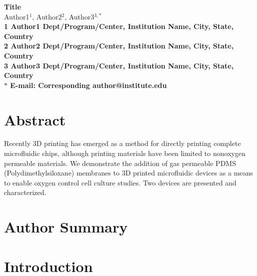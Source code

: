 \pagestyle{myheadings}







\begin{flushleft}
{\Large
\textbf{Title}
}
\\
Author1$^{1}$, 
Author2$^{2}$, 
Author3$^{3,\ast}$
\\
\bf{1} Author1 Dept/Program/Center, Institution Name, City, State, Country
\\
\bf{2} Author2 Dept/Program/Center, Institution Name, City, State, Country
\\
\bf{3} Author3 Dept/Program/Center, Institution Name, City, State, Country
\\
$\ast$ E-mail: Corresponding author@institute.edu
\end{flushleft}

\section*{Abstract}

Recently 3D printing has emerged as a method for directly printing complete microfluidic chips, 
although printing materials have been limited to non­oxygen permeable materials.
We demonstrate the addition of gas permeable PDMS (Polydimethylsiloxane) membranes to 3D printed microfluidic devices as a means to enable oxygen control cell culture studies.
Two devices are presented and characterized.


\section*{Author Summary}



\section*{Introduction}

